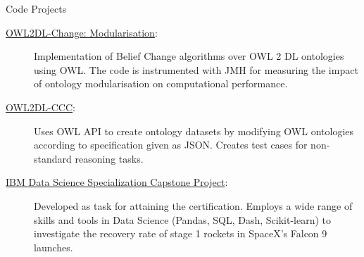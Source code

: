 \begin{rSection}{Code Projects}
    \begin{description}
        \item[\href{https://gitlab.com/rfguimaraes/owl-change}{OWL2DL-Change: Modularisation}:] Implementation of Belief Change algorithms over OWL 2 DL ontologies using OWL. The code is instrumented with JMH for measuring the impact of ontology modularisation on computational performance.
        \item[\href{https://gitlab.com/rfguimaraes/owl2dl-ccc}{OWL2DL-CCC}:] Uses OWL API to create ontology datasets by modifying OWL ontologies according to specification given as JSON. Creates test cases for non-standard reasoning tasks.
        \item[\href{https://github.com/rfguimaraes/DataScienceCapstone}{IBM Data Science Specialization Capstone Project}:] Developed as task for attaining the certification. Employs a wide range of skills and tools in Data Science (Pandas, SQL, Dash, Scikit-learn) to investigate the recovery rate of stage 1 rockets in SpaceX's Falcon 9 launches.
    \end{description}
\end{rSection}
